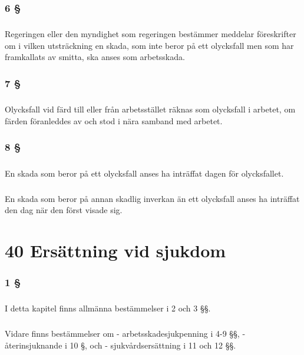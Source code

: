 \documentclass[a4paper,notitlepage,openany,10pt]{book}
\begin{document}
\subsection*{6 §}
\paragraph*{}
Regeringen eller den myndighet som regeringen bestämmer meddelar föreskrifter om i vilken utsträckning en skada, som inte beror på ett olycksfall men som har framkallats av smitta, ska anses som arbetsskada.
\subsection*{7 §}
\paragraph*{}
Olycksfall vid färd till eller från arbetsstället räknas som olycksfall i arbetet, om färden föranleddes av och stod i nära samband med arbetet.
\subsection*{8 §}
\paragraph*{}
En skada som beror på ett olycksfall anses ha inträffat dagen för olycksfallet.
\paragraph*{}
En skada som beror på annan skadlig inverkan än ett olycksfall anses ha inträffat den dag när den först visade sig.
\chapter*{40 Ersättning vid sjukdom}
\subsection*{1 §}
\paragraph*{}
I detta kapitel finns allmänna bestämmelser i 2 och 3 §§.
\paragraph*{}
Vidare finns bestämmelser om
\newline - arbetsskadesjukpenning i 4-9 §§,
\newline - återinsjuknande i 10 §, och
\newline - sjukvårdsersättning i 11 och 12 §§.
\end{document}
